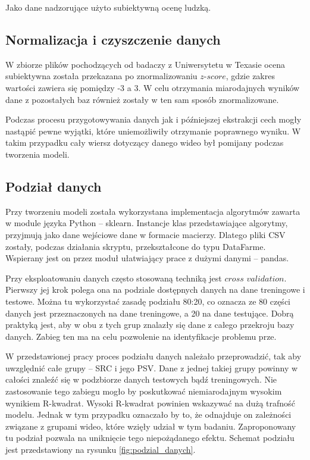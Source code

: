 Jako dane nadzorujące użyto subiektywną ocenę ludzką.\par

\subsection{Normalizacja i czyszczenie danych}
W zbiorze plików pochodzących od badaczy z Uniwersytetu w Texasie ocena subiektywna została przekazana po znormalizowaniu $z$-$score$, gdzie zakres wartości zawiera się pomiędzy -3 a 3. W celu otrzymania miarodajnych wyników dane z pozostałych baz również zostały w ten sam sposób znormalizowane.\par
Podczas procesu przygotowywania danych jak i późniejszej ekstrakcji cech mogły nastąpić pewne wyjątki, które uniemożliwiły otrzymanie poprawnego wyniku. W takim przypadku cały wiersz dotyczący danego wideo był pomijany podczas tworzenia modeli.

\subsection{Podział danych}

Przy tworzeniu modeli została wykorzystana implementacja algorytmów zawarta w module języka Python -- sklearn. Instancje klas przedstawiające algorytmy, przyjmują jako dane wejściowe dane w formacie macierzy. Dlatego pliki CSV zostały, podczas działania skryptu, przekształcone do typu DataFarme. Wspierany jest on przez moduł ułatwiający prace z dużymi danymi -- pandas.\par

Przy eksploatowaniu danych często stosowaną techniką jest $cross$ $validation$. Pierwszy jej krok polega ona na podziale dostępnych danych na dane treningowe i testowe. Można tu wykorzystać zasadę podziału 80:20, co oznacza ze 80 części danych jest przeznaczonych na dane treningowe, a 20 na dane testujące. Dobrą praktyką jest, aby w obu z tych grup znalazły się dane z całego przekroju bazy danych. Zabieg ten ma na celu pozwolenie na identyfikacje problemu prze. 

W przedstawionej pracy proces podziału danych należało przeprowadzić, tak aby uwzględnić  całe grupy --  SRC i jego PSV. Dane z jednej takiej grupy powinny w całości znaleźć się w podzbiorze danych testowych bądź treningowych. Nie zastosowanie tego zabiegu mogło by poskutkować niemiarodajnym wysokim wynikiem R-kwadrat. Wysoki R-kwadrat powinien wskazywać na dużą trafność modelu. Jednak w tym przypadku oznaczało by to, że odnajduje on zależności związane z grupami wideo, które wzięły udział w tym badaniu. Zaproponowany tu podział pozwala na uniknięcie tego niepożądanego efektu. Schemat podziału jest przedstawiony na rysunku \ref{fig:podzial_danych}.

